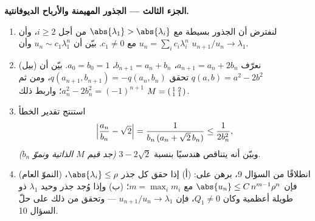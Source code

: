\begin{problem}
\medskip
\noindent\textbf{الجزء الثالث --- الجذور المهيمنة والأرباح
الديوفانتية.}
\begin{enumerate}[resume]
  \item لنفترض أن الجذور بسيطة مع $\abs{\lambda_1} >
        \abs{\lambda_i}$ من أجل $i \geq 2$، وأن $u_n = \sum_i c_i
        \lambda_i^n$ مع $c_1 \neq 0$. بيّن أن $u_n \sim
        c_1\lambda_1^n$ وأن $u_{n+1}/u_n \to \lambda_1$.
  \item (بيل) نعرّف $a_{n+1} = a_n + 2b_n$، $b_{n+1} = a_n +
        b_n$، $a_0 = b_0 = 1$. بيّن أن $q(a, b) = a^2 - 2b^2$
        تحقق $q(a_{n+1}, b_{n+1}) = -q(a_n, b_n)$، ومن ثم
        $a_n^2 - 2b_n^2 = (-1)^{n+1}$؛ واربط ذلك 
        $M = \begin{psmallmatrix}1 & 2\\ 1 &
        1\end{psmallmatrix}$.
  \item استنتج تقدير الخطأ
        \[
        \Bigl|\frac{a_n}{b_n} - \sqrt2\Bigr|
        = \frac{1}{b_n\,(a_n + \sqrt2\,b_n)}
        \leq \frac{1}{2b_n^2},
        \]
        وبيّن أنه يتناقص هندسيًا بنسبة $3 -
        2\sqrt2$ \emph{(جد قيم $M$ الذاتية ونموّ
        $b_n$)}.
  \item (النموّ العام) انطلاقًا من السؤال 9، برهن على: (أ) إذا حقق كل
        جذر $\abs{\lambda_i} \leq \rho$، فإن
        $\abs{u_n} \leq C\,n^{m-1}\rho^n$ مع $m = \max_i m_i$؛
        (ب) وإذا وُجد جذر وحيد $\lambda_1$ ذو طويلة أعظمية
        وكان $Q_1 \neq 0$، فإن $u_{n+1}/u_n \to
        \lambda_1$ --- وتحقق من ذلك على حلّ السؤال 10.
\end{enumerate}


\end{problem}
